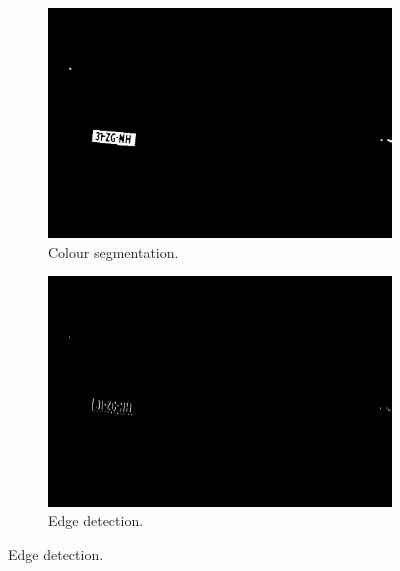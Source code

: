 \begin{figure}[ht]
        \centering
        \begin{subfigure}{0.7\textwidth}
            \includegraphics[width=\textwidth]{plaatjes/yellow-segment}
            \caption{Colour segmentation.}
            \label{fig:color-segmented}
        \end{subfigure}%
        
        \begin{subfigure}{0.7\textwidth}
            \includegraphics[width=\textwidth]{plaatjes/edge-detection}
            \caption{Edge detection.}
            \label{fig:edge-detected}
        \end{subfigure}%


\end{figure}
